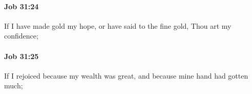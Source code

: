 		\paragraph{Job 31:24} %
			\label{JOB-31-24}

			If I have made gold my hope, or have said to the fine gold, Thou art my confidence;


		\paragraph{Job 31:25} %
			\label{JOB-31-25}

			If I rejoiced because my wealth was great, and because mine hand had gotten much;


